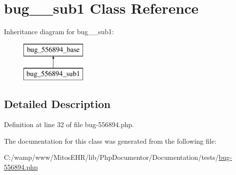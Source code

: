 \hypertarget{classbug__556894__sub1}{\section{bug\-\_\-\_\-sub1 \-Class \-Reference}
\label{classbug__556894__sub1}
}
\-Inheritance diagram for bug\-\_\-\_\-sub1\-:\begin{figure}[H]
\begin{center}
\leavevmode
\includegraphics[height=2.000000cm]{classbug__556894__sub1}
\end{center}
\end{figure}


\subsection{\-Detailed \-Description}


\-Definition at line 32 of file bug-\/556894.\-php.



\-The documentation for this class was generated from the following file\-:\begin{DoxyCompactItemize}
\item 
\-C\-:/wamp/www/\-Mitos\-E\-H\-R/lib/\-Php\-Documentor/\-Documentation/tests/\hyperlink{bug-556894_8php}{bug-\/556894.\-php}\end{DoxyCompactItemize}
